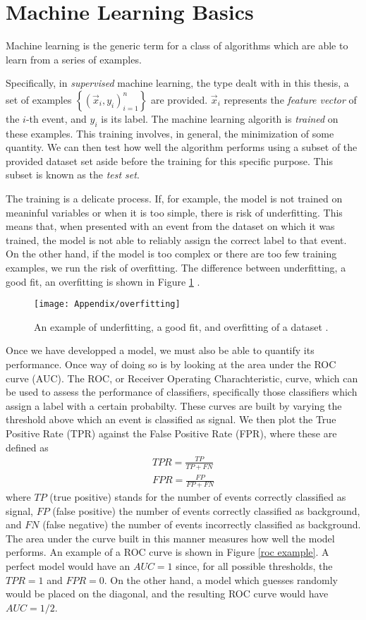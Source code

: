\documentclass[10pt,a4paper]{book}
\begin{document}
\section{Machine Learning Basics}

Machine learning is the generic term for a class of algorithms which are able to learn from a series of examples. 

Specifically, in \emph{supervised} machine learning, the type dealt with in this thesis, a set of examples $\left\lbrace (\vec{x}_i, y_i)_{i = 1}^n \right\rbrace$ are provided. $\vec{x}_i$ represents the \emph{feature vector} of the $i$-th event, and $y_i$ is its label. The machine learning algorith is \emph{trained} on these examples. This training involves, in general, the minimization of some quantity. We can then test how well the algorithm performs using a subset of the provided dataset set aside before the training for this specific purpose. This subset is known as the \emph{test set}.

The training is a delicate process. If, for example, the model is not trained on meaninful variables or when it is too simple, there is risk of underfitting. This means that, when presented with an event from the dataset on which it was trained, the model is not able to reliably assign the correct label to that event. On the other hand, if the model is too complex or there are too few training examples, we run the risk of overfitting. The difference between underfitting, a good fit, an overfitting is shown in Figure \ref{overfitting} . 

\begin{figure}
\centering
\texttt{[image: Appendix/overfitting]}
\label{overfitting}
\caption{An example of underfitting, a good fit, and overfitting of a dataset \cite{burkov2019hundred}.}
\end{figure}

Once we have developped a model, we must also be able to quantify its performance. Once way of doing so is by looking at the area under the ROC curve (AUC). The ROC, or Receiver Operating Charachteristic, curve, which can be used to assess the performance of classifiers, specifically those classifiers which assign a label with a certain probabilty. These curves are built by varying the threshold above which an event is classified as signal. We then plot the True Positive Rate (TPR) against the False Positive Rate (FPR), where these are defined as
\begin{gather}
TPR = \frac{TP}{TP + FN} \\
FPR = \frac{FP}{FP + FN}
\end{gather}
where $TP$ (true positive) stands for the number of events correctly classified as signal, $FP$ (false positive) the number of events correctly classified as background, and $FN$ (false negative) the number of events incorrectly classified as background. The area under the curve built in this manner measures how well the model performs. An example of a ROC curve is shown in Figure \ref{roc example}. A perfect model would have an $AUC = 1$ since, for all possible thresholds, the $TPR = 1$ and $FPR = 0$. On the other hand, a model which guesses randomly would be placed on the diagonal, and the resulting ROC curve would have $AUC = 1/2$.
\end{document}
